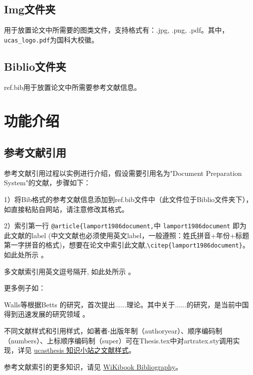 {\subsection{Img文件夹}

用于放置论文中所需要的图类文件，支持格式有：.jpg, .png, .pdf。其中，\verb|ucas_logo.pdf|为国科大校徽。

\subsection{Biblio文件夹}

 ref.bib用于放置论文中所需要参考文献信息。

\section{功能介绍}

\subsection{参考文献引用}

参考文献引用过程以实例进行介绍，假设需要引用名为"Document Preparation System"的文献，步骤如下：

1）将Bib格式的参考文献信息添加到ref.bib文件中（此文件位于Biblio文件夹下），如直接粘贴自网站，请注意修改其格式。

2）索引第一行 \verb|@article{lamport1986document,|中 \verb|lamport1986document| 即为此文献的label (中文文献也必须使用英文label，一般遵照：姓氏拼音+年份+标题第一字拼音的格式)，想要在论文中索引此文献,\verb|\citep{lamport1986document}|。如此处所示 \textsuperscript{\citep{lamport1986document}}。

多文献索引用英文逗号隔开, 如此处所示 \textsuperscript{\citep{lamport1986document, chu2004tushu, chen2005zhulu}}。

更多例子如：

Walls等\textsuperscript{\citep{walls2013drought}}根据Betts\textsuperscript{\citep{betts2005aging}} 的研究，首次提出......理论。其中关于......的研究\textsuperscript{}，是当前中国得到迅速发展的研究领域 \textsuperscript{\citep{chen1980zhongguo, bravo1990comparative}}。

不同文献样式和引用样式，如著者-出版年制（authoryear）、顺序编码制（numbers）、上标顺序编码制（super）可在Thesis.tex中对artratex.sty调用实现，详见 \href{https://github.com/mohuangrui/ucasthesis/wiki}{ucasthesis 知识小站之文献样式}。


参考文献索引的更多知识，请见 \href{https://en.wikibooks.org/wiki/LaTeX/Bibliography_Management}{WiKibook Bibliography}。\nocite{*}%


}

